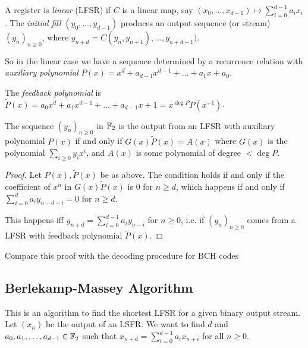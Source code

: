 \documentclass[10pt,a4paper]{article}
\begin{document}
A register is \emph{linear} (LFSR) if $C$ is a linear map, say $(x_0, \ldots, x_{d-1}) \mapsto \sum_{i=0}^{d-1} a_ix_i$. The \emph{initial fill} $(y_0, \ldots, y_{d-1})$ produces an output sequence (or stream) $(y_n)_{n\geq 0}$, where $y_{n+d} = C(y_n, y_{n+1}), \ldots, y_{n+d-1})$. 

So in the linear case we have a sequence determined by a recurrence relation with \emph{auxiliary polynomial} $P(x) = x^d + a_{d-1}x^{d-1}+\ldots+a_1 x+a_0$.

The \emph{feedback polynomial} is $\tilde{P}(x) = a_0 x^d+a_1 x^{d-1}+\ldots+a_{d-1}x + 1 = x^{\deg P}P(x^{-1})$.

\begin{lemma}
The sequence $(y_n)_{n\geq 0}$ in $\mathbb{F}_2$ is the output from an LFSR with auxiliary polynomial $P(x)$ if and only if $G(x)\tilde{P}(x) = A(x)$ where $G(x)$ is the polynomial $\sum_{i\geq 0}y_i x^i$, and $A(x)$ is some polynomial of degree $< \deg P$.
\end{lemma}
\begin{proof}
Let $P(x), \tilde{P}(x)$ be as above. The condition holds if and only if the coefficient of $x^n$ in $G(x)\tilde{P}(x)$ is 0 for $n \geq d$, which happens if and only if $\sum_{i=0}^{d}a_iy_{n-d+i} =0$ for $n \geq d$.

This happens iff $y_{n+d} = \sum_{i=0}^{d-1}a_i y_{n-i}$ for $n \geq 0$, i.e. if $(y_n)_{n \geq 0}$ comes from a LFSR with feedback polynomial $\tilde{P}(x)$.
\end{proof}
Compare this proof with the decoding procedure for BCH codes
\subsection{Berlekamp-Massey Algorithm}
This is an algorithm to find the shortest LFSR for a given binary output stream. Let $(x_n)$ be the output of an LSFR. We want to find $d$ and $a_0, a_1, \ldots, a_{d-1} \in \mathbb{F}_2$ such that $x_{n+d} = \sum_{i=0}^{d-1} a_i x_{n+i}$ for all $n \geq 0$.
\end{document}
